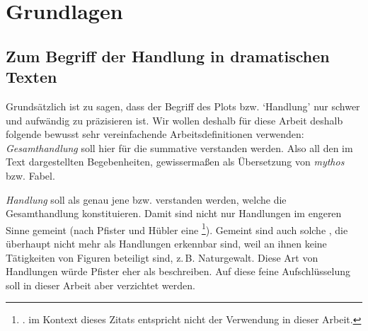 \documentclass[a4paper,10pt,abstract=true,headings=small]{scrartcl}
\begin{document}
\section{Grundlagen}\label{sec:grundlagen}

\subsection{Zum Begriff der Handlung in dramatischen Texten}\label{sec:handlung}

Grundsätzlich ist zu sagen, dass der Begriff des Plots bzw. \enquote*{Handlung} nur schwer und aufwändig zu präzisieren ist.\autocites[Vgl.][]{kukkonen_plot_2014}[Vgl.][]{herman_routledge_2005}
Wir wollen deshalb für diese Arbeit deshalb folgende bewusst sehr vereinfachende Arbeitsdefinitionen verwenden: \emph{Gesamthandlung} soll hier für die summative   verstanden werden.
Also all den im Text dargestellten Begebenheiten, gewissermaßen als Übersetzung von \emph{mythos} bzw. Fabel.

\emph{Handlung} soll als genau jene  bzw.  verstanden werden, welche die Gesamthandlung konstituieren.\autocite[Vgl.][5--8]{asmuth_einfuhrung_2016}
Damit sind nicht nur Handlungen im engeren Sinne gemeint (nach Pfister und Hübler eine \footnote{\cite[269]{pfister_drama:_2001}.  im Kontext dieses Zitats entspricht nicht der Verwendung in dieser Arbeit.}). Gemeint sind auch solche , die überhaupt nicht mehr als Handlungen erkennbar sind, weil an ihnen keine Tätigkeiten von Figuren beteiligt sind, z.\,B. Naturgewalt.
Diese Art von Handlungen würde Pfister eher als  beschreiben\autocite[Vgl.][270]{pfister_drama:_2001}.
Auf diese feine Aufschlüsselung soll in dieser Arbeit aber verzichtet werden.
\end{document}
